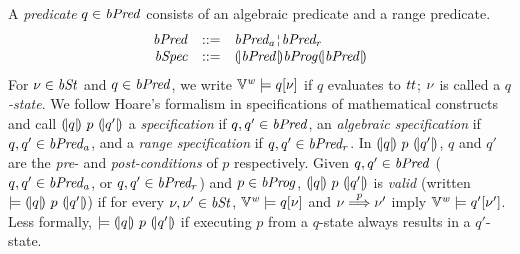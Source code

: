 A \emph{predicate} $q \in \mathit{bPred}$ consists of an algebraic predicate and a range predicate.
\[
\begin{array}{rcl}
  \bvPred & ::= & \bvPreda \andar \bvPredr \\
  \bvSpec & ::= & \cond{\bvPred} \bvProg \cond{\bvPred}
\end{array}
\]
For $\nu \in \mathit{bSt}$ and $q \in \mathit{bPred}$, we write $\mathbb{V}^{\mathit{w}} \models q[\nu]$ if $q$ evaluates to $\mathit{tt}$; $\nu$ is called a \emph{$q$-state}.
We follow Hoare's formalism in specifications of mathematical constructs~\cite{H:69:ABCP} and call ${(\!|}{q}{|\!)}~{p}~{(\!|}{q'}{|\!)}$ a \emph{specification} if $q,q' \in \mathit{bPred}$, an \emph{algebraic specification} if $q,q' \in \mathit{bPred_a}$, and a \emph{range specification} if $q,q' \in \mathit{bPred_r}$.
In ${(\!|}{q}{|\!)}~{p}~{(\!|}{q'}{|\!)}$, $q$ and $q'$ are the \emph{pre}- and \emph{post-conditions} of $p$ respectively.
Given $q, q' \in \mathit{bPred}$ ($q,q' \in \mathit{bPred_a}$, or $q,q' \in \mathit{bPred_r}$) and $p \in \mathit{bProg}$, ${(\!|}{q}{|\!)}~{p}~{(\!|}{q'}{|\!)}$ is \emph{valid} (written $\models {(\!|}{q}{|\!)}~{p}~{(\!|}{q'}{|\!)}$) if for every $\nu, \nu' \in \mathit{bSt}$, $\mathbb{V}^{\mathit{w}} \models q[\nu]$ and $\nu \overset{p}{\Longrightarrow} \nu'$ imply $\mathbb{V}^{\mathit{w}} \models q'[\nu']$.
Less formally, $\models {(\!|}{q}{|\!)}~{p}~{(\!|}{q'}{|\!)}$ if executing $p$ from a $q$-state always results in a $q'$-state.


